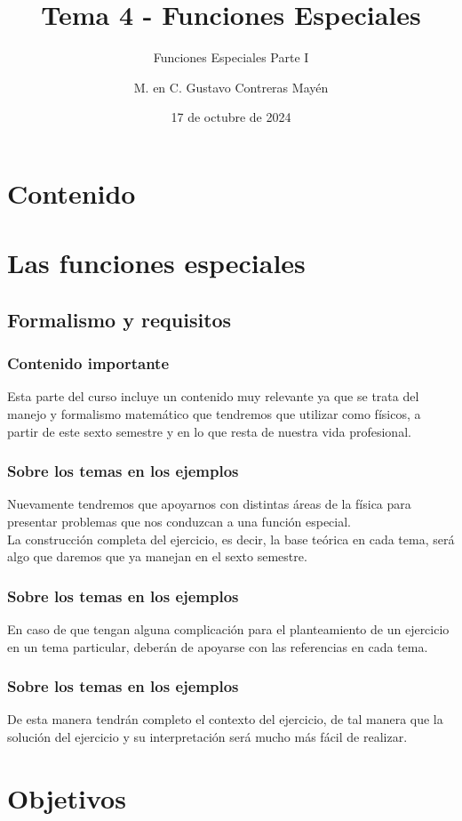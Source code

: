 \documentclass[12pt]{beamer}
\date{17 de octubre de 2024}
\title{\large{Tema 4 - Funciones Especiales}}
\subtitle{Funciones Especiales Parte I}
\author{M. en C. Gustavo Contreras Mayén}
\begin{document}
\maketitle
\fontsize{14}{14}\selectfont
{}

\section*{Contenido}

\section{Las funciones especiales}
\subsection{Formalismo y requisitos}

\begin{frame}
\frametitle{Contenido importante}
Esta parte del curso incluye un contenido muy relevante ya que se trata del manejo y formalismo matemático que tendremos que utilizar como físicos, a partir de este sexto semestre y en lo que resta de nuestra vida profesional.
\end{frame}
\begin{frame}
\frametitle{Sobre los temas en los ejemplos}
Nuevamente tendremos que apoyarnos con distintas áreas de la física para presentar problemas que nos conduzcan a una función especial.
\\
\bigskip
\pause
La construcción completa del ejercicio, es decir, la base teórica en cada tema, será algo que daremos que ya manejan en el sexto semestre.
\end{frame}
\begin{frame}
\frametitle{Sobre los temas en los ejemplos}
En caso de que tengan alguna complicación para el planteamiento de un ejercicio en un tema particular, deberán de apoyarse con las referencias en cada tema.
\end{frame}
\begin{frame}
\frametitle{Sobre los temas en los ejemplos}
De esta manera tendrán completo el contexto del ejercicio, de tal manera que la solución del ejercicio y su interpretación será mucho más fácil de realizar.
\end{frame}

\section{Objetivos}
\end{document}
